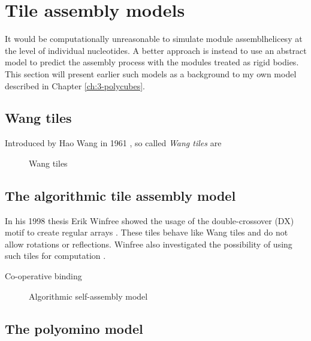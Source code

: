 \section{Tile assembly models}
It would be computationally unreasonable to simulate module assemblhelicesy at the level of individual nucleotides. A better approach is instead to use an abstract model to predict the assembly process with the modules treated as rigid bodies. This section will present earlier such models as a background to my own model described in Chapter \ref{ch:3-polycubes}.

\subsection{Wang tiles}
Introduced by Hao Wang in 1961 \cite{wang1961proving}, so called \emph{Wang tiles} are 

\begin{figure}[h]
  \centering
  \caption{Wang tiles}
\end{figure}

\subsection{The algorithmic tile assembly model}



In his 1998 thesis Erik Winfree showed the usage of the double-crossover (DX) motif to create regular arrays \cite{winfree1998design}. These tiles behave like Wang tiles\cite{wang1961proving} and do not allow rotations or reflections. Winfree also investigated the possibility of using such tiles for computation \cite{winfree1998algorithmic}.

Co-operative binding

\begin{figure}[h]
  \centering
  \caption{Algorithmic self-assembly model}
\end{figure}

\subsection{The polyomino model}\label{sec:polyomino}

